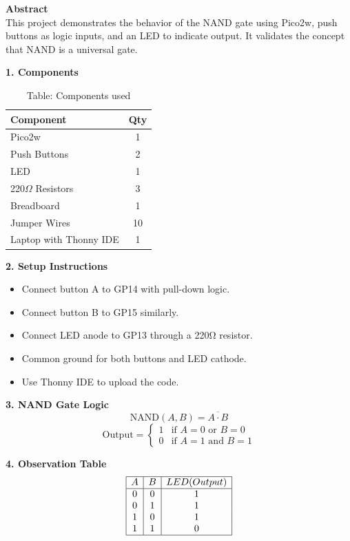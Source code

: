 \documentclass[12pt]{article}
\begin{document}
\begin{multicols}{2}

\noindent\textbf{Abstract} \\[0.5em]
This project demonstrates the behavior of the NAND gate using  Pico2w, push buttons as logic inputs, and an LED to indicate output. It validates the concept that NAND is a universal gate.

\vspace{1em}
\noindent\textbf{1. Components}
\begin{table}[H]
\small
\centering
\begin{tabular}{|p{4.2cm}|c|}
\hline
\textbf{Component} & \textbf{Qty} \\
\hline
 Pico2w & 1 \\
Push Buttons & 2 \\
LED & 1 \\
220$\Omega$ Resistors & 3 \\
Breadboard & 1 \\
Jumper Wires & 10 \\
Laptop with Thonny IDE & 1 \\
\hline
\end{tabular}
\caption*{Table: Components used}
\end{table}

\vspace{1em}
\noindent\textbf{2. Setup Instructions}
\begin{itemize}
    \item Connect button A to GP14 with pull-down logic.
    \item Connect button B to GP15 similarly.
    \item Connect LED anode to GP13 through a 220Ω resistor.
    \item Common ground for both buttons and LED cathode.
    \item Use Thonny IDE to upload the code.
\end{itemize}

\vspace{1em}
\noindent\textbf{3. NAND Gate Logic}
\[
\text{NAND}(A, B) = \overline{A \cdot B}
\]
\[
\text{Output} = 
\begin{cases}
1 & \text{if } A = 0 \text{ or } B = 0 \\
0 & \text{if } A = 1 \text{ and } B = 1
\end{cases}
\]
\end{multicols}
\vspace{1em}
\noindent\textbf{4. Observation Table}
\\
\[
\begin{array}{|c|c|c|}
\hline
A & B & LED (Output) \\
\hline
0 & 0 & 1 \\
0 & 1 & 1 \\
1 & 0 & 1 \\
1 & 1 & 0 \\
\hline
\end{array}
\]
\end{document}
